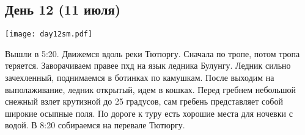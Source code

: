 \graphicspath{{Pictures/Chapter5/Day12}}


\subsection{День 12 (11 июля)}\label{subsec:Day12}
    \parbox[c]{\textwidth}{%
        \texttt{[image: day12sm.pdf]}\label{fig:Day12_map}%
    }
    \vspace{0.8cm}

Вышли в 5:20. Движемся вдоль реки Тютюргу. Сначала по тропе, потом тропа теряется. Заворачиваем правее пхд на язык ледника Булунгу. Ледник сильно зачехленный, поднимаемся в ботинках по камушкам. После выходим на выполаживание, ледник открытый, идем в кошках. Перед гребнем небольшой снежный взлет крутизной до 25 градусов, сам гребень представляет собой широкие осыпные поля. По дороге к туру есть хорошие места для ночевки с водой. В 8:20 собираемся на перевале Тютюргу.

